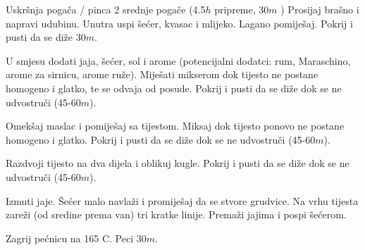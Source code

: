 \documentclass[a4paper]{article}
\begin{document}
\begin{recipe}{Uskršnja pogača / pinca}%
  {2 srednje pogače}%
  { (4.5$h$ pripreme, 30$m$ \oven )}
  Prosijaj brašno i napravi udubinu. Unutra uspi šećer, kvasac i mlijeko.
  Lagano pomiješaj. Pokrij i pusti da se diže 30$m$.

  U smjesu dodati jaja, šećer, sol i arome (potencijalni dodatci: rum, Maraschino, arome za sirnicu, arome ruže). Miješati mikserom dok tijesto ne postane homogeno i glatko, te se odvaja od posude. Pokrij i pusti da se diže dok se ne udvostruči (45-60$m$).

  Omekšaj maslac i pomiješaj sa tijestom. Miksaj dok tijesto ponovo ne postane
  homogeno i glatko. Pokrij i pusti da se diže dok se ne udvostruči (45-60$m$).

\newstep
  Razdvoji tijesto na dva dijela i oblikuj kugle. Pokrij i pusti da se diže dok
  se ne udvostruči (45-60$m$).

  Izmuti jaje. Šećer malo navlaži i promiješaj da se stvore grudvice. Na vrhu
  tijesta zareži (od sredine prema van) tri kratke linije. Premaži jajima i
  pospi šećerom.

\ingredient[]{}{\oven}
  Zagrij pećnicu na 165\0 C. Peci 30$m$.
\end{recipe}
\end{document}
